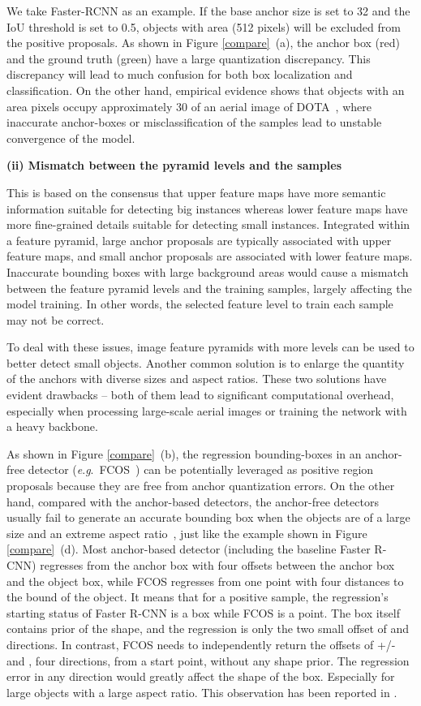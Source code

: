 \documentclass[journal]{IEEEtran}
\newcommand{\myparagraph}[1]{\vspace{0.1em}\noindent\textbf{#1}}
\newcommand{\eg}{\textit{e}.\textit{g}.}
\begin{document}
We take Faster-RCNN \cite{ren2016faster} as an example. If the base anchor size is set to 32 and the IoU threshold is set to 0.5, objects with area  (512 pixels) will be excluded from the positive proposals. As shown in Figure \ref{compare}~(a), the anchor box (red) and the ground truth (green) have a large quantization discrepancy. This discrepancy will lead to much confusion for both box localization and classification. On the other hand, empirical evidence shows that objects with an area  pixels occupy approximately 30 of an aerial image of DOTA~\cite{xia2018dota}, where inaccurate anchor-boxes or misclassification of the samples lead to unstable convergence of the model. 

\myparagraph{(ii) Mismatch between the pyramid levels and the samples} 

This is based on the consensus that upper feature maps have more semantic information suitable for detecting big instances whereas lower feature maps have more fine-grained details suitable for detecting small instances. Integrated within a feature pyramid, large anchor proposals are typically associated with upper feature maps, and small anchor proposals are associated with lower feature maps. Inaccurate bounding boxes with large background areas would cause a mismatch between the feature pyramid levels and the training samples, largely affecting the model training. In other words, the selected feature level to train each sample may not be correct.

To deal with these issues, image feature pyramids with more levels can be used to better detect small objects. Another common solution is to enlarge the quantity of the anchors with diverse sizes and aspect ratios. These two solutions have evident drawbacks -- both of them lead to significant computational overhead, especially when processing large-scale aerial images or training the network with a heavy backbone.  

As shown in Figure \ref{compare}~(b), the regression bounding-boxes in an anchor-free detector (\eg ~FCOS~\cite{tian2019fcos}) can be potentially leveraged as positive region proposals because they are free from anchor quantization errors. On the other hand, compared with the anchor-based detectors, the anchor-free detectors usually fail to generate an accurate bounding box when the objects are of a large size and an extreme aspect ratio~\cite{law2018cornernet,zhou2019objects,tian2019fcos}, just like the example shown in Figure \ref{compare}~(d). Most anchor-based detector (including the baseline Faster R-CNN) regresses from the anchor box with four offsets between the anchor box and the object box, while FCOS regresses from one point with four distances to the bound of the object. It means that for a positive sample, the regression's starting status of Faster R-CNN is a box while FCOS is a point. The box itself contains prior of the shape, and the regression is only the two small offset of  and  directions. In contrast, FCOS needs to independently return the offsets of +/- and , four directions, from a start point, without any shape prior. The regression error in any direction would greatly affect the shape of the box. Especially for large objects with a large aspect ratio. This observation has been reported in \cite{2020Corner}.
\end{document}
